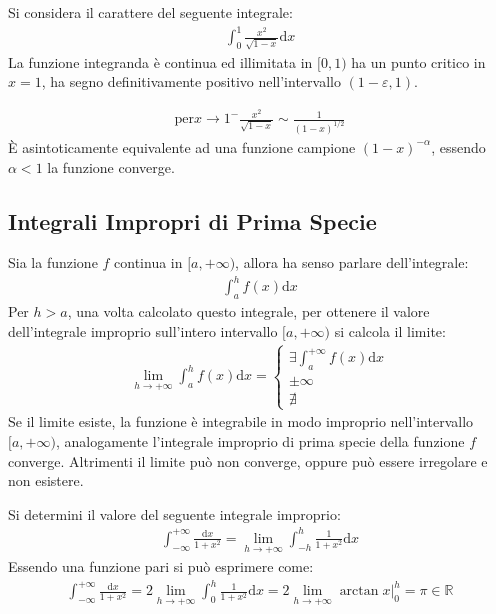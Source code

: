 \documentclass{article}
\newcommand{\df}{\mathrm{d}}
\numberwithin{equation}{subsection}
\begin{document}

Si considera il carattere del seguente integrale:
\begin{gather*}
    \displaystyle\int_0^1\frac{x^2}{\sqrt{1-x}}\mathrm{d}x
\end{gather*}
La funzione integranda è continua ed illimitata in $[0,1)$ ha un punto critico in $x=1$, ha segno definitivamente positivo nell'intervallo $(1-\varepsilon, 1)$. 

\begin{gather*}
    \mbox{per}x\to1^-\displaystyle\frac{x^2}{\sqrt{1-x}}\sim\frac{1}{(1-x)^{1/2}}
\end{gather*}
È asintoticamente equivalente ad una funzione campione $(1-x)^{-\alpha}$, essendo $\alpha<1$ la funzione converge. 

\subsection{Integrali Impropri di Prima Specie}

Sia la funzione $f$ continua in $[a,+\infty)$, allora ha senso parlare dell'integrale:
\begin{gather*}
    \displaystyle\int_a^hf(x)\mathrm{d}x
\end{gather*}
Per $h>a$, una volta calcolato questo integrale, per ottenere il valore dell'integrale improprio sull'intero intervallo $[a,+\infty)$ si calcola il limite:
\begin{gather*}
    \lim_{h\to+\infty}\displaystyle\int_a^hf(x)\mathrm{d}x=\begin{cases}
        \exists\displaystyle\int_a^{+\infty}f(x)\mathrm{d}x\\
        \pm\infty\\
        \nexists
    \end{cases}
\end{gather*}
Se il limite esiste, la funzione è integrabile in modo improprio nell'intervallo $[a,+\infty)$, analogamente l'integrale improprio di prima specie della funzione $f$ converge. Altrimenti il limite può non converge, oppure può essere irregolare e non esistere. 

Si determini il valore del seguente integrale improprio:
\begin{gather*}
    \displaystyle\int_{-\infty}^{+\infty}\frac{\df x}{1+x^2}
    =\lim_{h\to+\infty}\int_{-h}^h\frac{1}{1+x^2}\df x
\end{gather*}
Essendo una funzione pari si può esprimere come:
\begin{gather*}
    \displaystyle\int_{-\infty}^{+\infty}\frac{\df x}{1+x^2}=
    2\lim_{h\to+\infty}\int_0^h\frac{1}{1+x^2}\df x=
    2\lim_{h\to+\infty}\arctan x\bigg|_0^h=\pi\in\mathbb{R}
\end{gather*}
\end{document}

